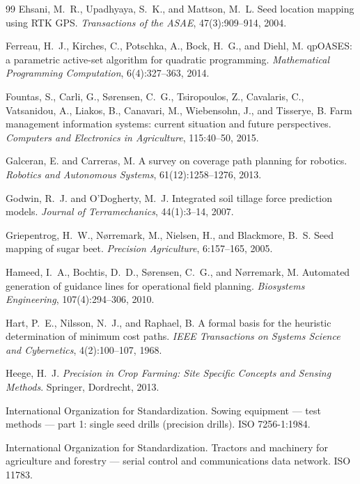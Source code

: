 \begin{thebibliography}{99}
Ehsani, M.~R., Upadhyaya, S.~K., and Mattson, M.~L.
Seed location mapping using RTK GPS.
\textit{Transactions of the ASAE}, 47(3):909--914, 2004.

Ferreau, H.~J., Kirches, C., Potschka, A., Bock, H.~G., and Diehl, M.
qpOASES: a parametric active-set algorithm for quadratic programming.
\textit{Mathematical Programming Computation}, 6(4):327--363, 2014.

Fountas, S., Carli, G., S{\o}rensen, C.~G., Tsiropoulos, Z., Cavalaris, C., Vatsanidou, A., Liakos, B., Canavari, M., Wiebensohn, J., and Tisserye, B.
Farm management information systems: current situation and future perspectives.
\textit{Computers and Electronics in Agriculture}, 115:40--50, 2015.

Galceran, E. and Carreras, M.
A survey on coverage path planning for robotics.
\textit{Robotics and Autonomous Systems}, 61(12):1258--1276, 2013.

Godwin, R.~J. and O'Dogherty, M.~J.
Integrated soil tillage force prediction models.
\textit{Journal of Terramechanics}, 44(1):3--14, 2007.

Griepentrog, H.~W., N{\o}rremark, M., Nielsen, H., and Blackmore, B.~S.
Seed mapping of sugar beet.
\textit{Precision Agriculture}, 6:157--165, 2005.

Hameed, I.~A., Bochtis, D.~D., S{\o}rensen, C.~G., and N{\o}rremark, M.
Automated generation of guidance lines for operational field planning.
\textit{Biosystems Engineering}, 107(4):294--306, 2010.

Hart, P.~E., Nilsson, N.~J., and Raphael, B.
A formal basis for the heuristic determination of minimum cost paths.
\textit{IEEE Transactions on Systems Science and Cybernetics}, 4(2):100--107, 1968.

Heege, H.~J.
\textit{Precision in Crop Farming: Site Specific Concepts and Sensing Methods}.
Springer, Dordrecht, 2013.

International Organization for Standardization.
Sowing equipment --- test methods --- part 1: single seed drills (precision drills).
ISO 7256-1:1984.

International Organization for Standardization.
Tractors and machinery for agriculture and forestry --- serial control and communications data network.
ISO 11783.


\end{thebibliography}
